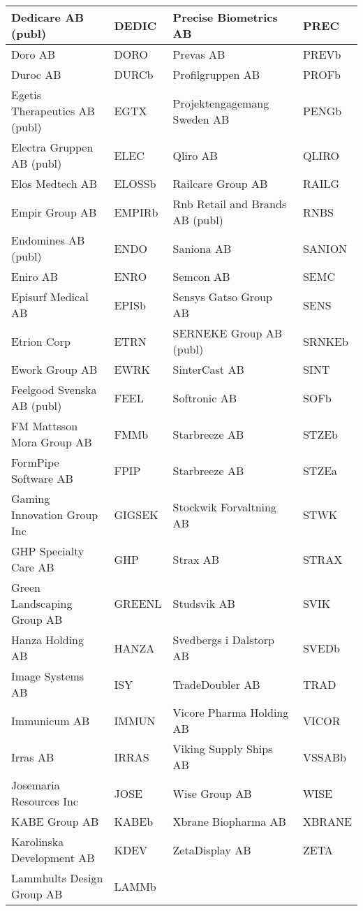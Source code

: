 \documentclass[11pt]{article}
\numberwithin{equation}{section}
\numberwithin{table}{section}
\numberwithin{figure}{section}
\begin{document}
\begin{table}[H]
{\begin{tabular}{|l|l|l|l|}
Dedicare AB (publ) & DEDIC & Precise Biometrics AB & PREC \\ \hline
\rowcolor[HTML]{EFEFEF} 
Doro AB & DORO & Prevas AB & PREVb \\ \hline
Duroc AB & DURCb & Profilgruppen AB & PROFb \\ \hline
\rowcolor[HTML]{EFEFEF} 
Egetis Therapeutics AB (publ) & EGTX & Projektengagemang Sweden AB & PENGb \\ \hline
Electra Gruppen AB (publ) & ELEC & Qliro AB & QLIRO \\ \hline
\rowcolor[HTML]{EFEFEF} 
Elos Medtech AB & ELOSSb & Railcare Group AB & RAILG \\ \hline
Empir Group AB & EMPIRb & Rnb Retail and Brands AB (publ) & RNBS \\ \hline
\rowcolor[HTML]{EFEFEF} 
Endomines AB (publ) & ENDO & Saniona AB & SANION \\ \hline
Eniro AB & ENRO & Semcon AB & SEMC \\ \hline
\rowcolor[HTML]{EFEFEF} 
Episurf Medical AB & EPISb & Sensys Gatso Group AB & SENS \\ \hline
Etrion Corp & ETRN & SERNEKE Group AB (publ) & SRNKEb \\ \hline
\rowcolor[HTML]{EFEFEF} 
Ework Group AB & EWRK & SinterCast AB & SINT \\ \hline
Feelgood Svenska AB (publ) & FEEL & Softronic AB & SOFb \\ \hline
\rowcolor[HTML]{EFEFEF} 
FM Mattsson Mora Group AB & FMMb & Starbreeze AB & STZEb \\ \hline
FormPipe Software AB & FPIP & Starbreeze AB & STZEa \\ \hline
\rowcolor[HTML]{EFEFEF} 
Gaming Innovation Group Inc & GIGSEK & Stockwik Forvaltning AB & STWK \\ \hline
GHP Specialty Care AB & GHP & Strax AB & STRAX \\ \hline
\rowcolor[HTML]{EFEFEF} 
Green Landscaping Group AB & GREENL & Studsvik AB & SVIK \\ \hline
Hanza Holding AB & HANZA & Svedbergs i Dalstorp AB & SVEDb \\ \hline
\rowcolor[HTML]{EFEFEF} 
Image Systems AB & ISY & TradeDoubler AB & TRAD \\ \hline
Immunicum AB & IMMUN & Vicore Pharma Holding AB & VICOR \\ \hline
\rowcolor[HTML]{EFEFEF} 
Irras AB & IRRAS & Viking Supply Ships AB & VSSABb \\ \hline
Josemaria Resources Inc & JOSE & Wise Group AB & WISE \\ \hline
\rowcolor[HTML]{EFEFEF} 
KABE Group AB & KABEb & Xbrane Biopharma AB & XBRANE \\ \hline
Karolinska Development AB & KDEV & ZetaDisplay AB & ZETA \\ \hline
\rowcolor[HTML]{EFEFEF} 
Lammhults Design Group AB & LAMMb & \multicolumn{2}{l|}{\cellcolor[HTML]{EFEFEF}} \\ \hline
\end{tabular}}
\end{table}
\end{document}
